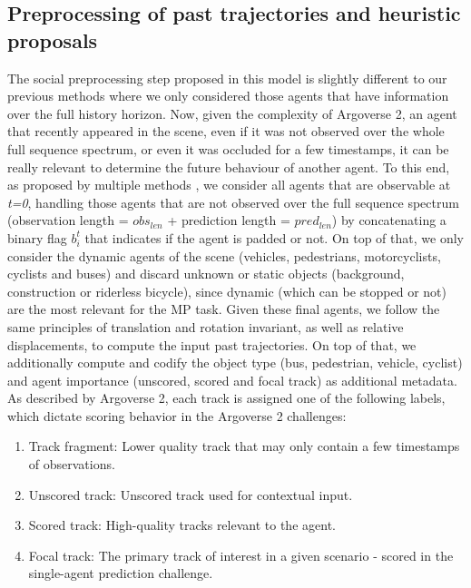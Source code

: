 \subsection{Preprocessing of past trajectories and heuristic proposals}
\label{subsec:7_improving_efficiency_preprocessing}

The social preprocessing step proposed in this model is slightly different to our previous methods where we only considered those agents that have information over the full history horizon. Now, given the complexity of Argoverse 2, an agent that recently appeared in the scene, even if it was not observed over the whole full sequence spectrum, or even it was occluded for a few timestamps, it can be really relevant to determine the future behaviour of another agent. To this end, as proposed by multiple methods \cite{liang2020learning, schmidt2022crat}, we consider all agents that are observable at \textit{t=0}, handling those agents that are not observed over the full sequence spectrum (observation length = \textit{$obs_{len}$} + prediction length = \textit{$pred_{len}$}) by concatenating a binary flag $b_i^t$ that indicates if the agent is padded or not. On top of that, we only consider the dynamic agents of the scene (vehicles, pedestrians, motorcyclists, cyclists and buses) and discard unknown or static objects (background, construction or riderless bicycle), since dynamic (which can be stopped or not) are the most relevant for the \ac{MP} task. Given these final agents, we follow the same principles of translation and rotation invariant, as well as relative displacements, to compute the input past trajectories. On top of that, we additionally compute and codify the object type (bus, pedestrian, vehicle, cyclist) and agent importance (unscored, scored and focal track) as additional metadata. As described by Argoverse 2, each track is assigned one of the following labels, which dictate scoring behavior in the Argoverse 2 challenges:

\begin{enumerate}
	\item Track fragment: Lower quality track that may only contain a few timestamps of observations.
	\item Unscored track: Unscored track used for contextual input.
	\item Scored track: High-quality tracks relevant to the agent.
	\item Focal track: The primary track of interest in a given scenario - scored in the single-agent prediction challenge.
\end{enumerate}

